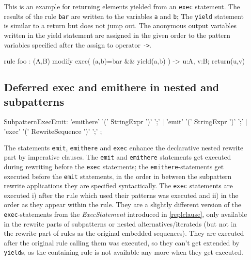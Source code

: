 \begin{example}
This is an example for returning elements yielded from an \texttt{exec} statement.
The results of the rule \texttt{bar} are written to the variables \texttt{a} and \texttt{b};
The \texttt{yield} statement is similar to a return but does not jump out. 
The anonymous output variables written in the yield statement are assigned in the given order to the pattern variables specified after the assign to operator \verb#->#.

	\begin{grgen}
rule foo : (A,B)
{
  modify {
    exec( (a,b)=bar && yield(a,b) ) -> u:A, v:B;
    return(u,v)
  }
}  
	\end{grgen}
\end{example}

\subsection{Deferred exec and emithere in nested and subpatterns}

\begin{rail}  
  SubpatternExecEmit: 
		'emithere' '(' StringExpr ')' ';' |
		'emit' '(' StringExpr ')' ';' |
		'exec' '(' RewriteSequence ')' ';'
	;
\end{rail}

The statements \texttt{emit}, \texttt{emithere} and \texttt{exec} enhance the declarative nested rewrite part by imperative clauses.
The \texttt{emit} and \texttt{emithere} statements get executed during rewriting before the \texttt{exec} statements;
the \texttt{emithere}-statements get executed before the \texttt{emit} statements,
in the order in between the subpattern rewrite applications they are specified syntactically.
The \texttt{exec} statements are executed i) after the rule which used their patterns was executed
and ii) in the order as they appear within the rule.
They are a slightly different version of the \texttt{exec}-statements from the \emph{ExecStatement} introduced in \ref{replclause}, only available in the rewrite parts of subpatterns or nested alternatives/iterateds
(but not in the rewrite part of rules as the original embedded sequences).
They are executed after the original rule calling them was executed,
so they can't get extended by \texttt{yield}s, 
as the containing rule is not available any more when they get executed.

